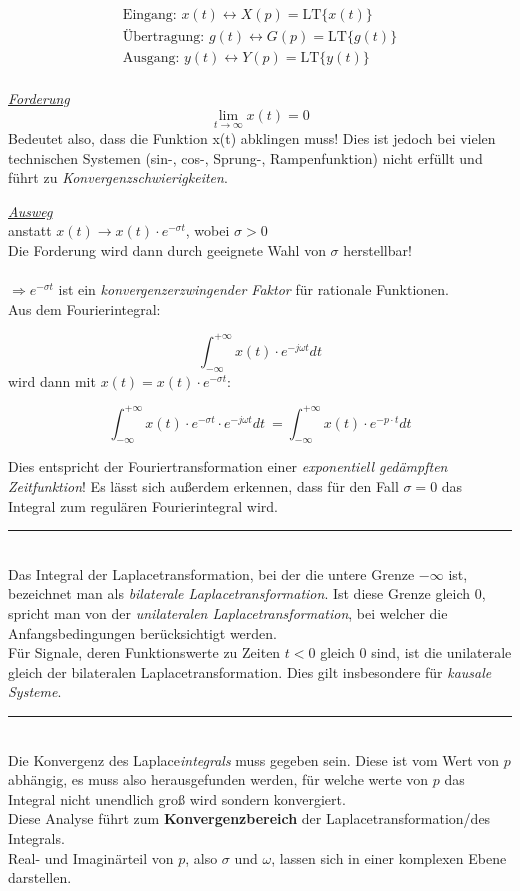 \documentclass[a4paper, 12pt]{article}
\newcommand{\holine}{
  \noindent\rule{\textwidth}{0.618pt}\\[0.021286\paperheight]
}
\newcommand{\minisec}[1]{ \underline{\textit {#1} } \\[0.021286\paperheight]}
\begin{document}
\begin{align*}
  \text{Eingang:  } x(t) \leftrightarrow X(p) = \text{LT}\{x(t)\}\\
  \text{Übertragung:  } g(t) \leftrightarrow G(p) = \text{LT}\{g(t)\}\\
  \text{Ausgang:  } y(t) \leftrightarrow Y(p) = \text{LT}\{y(t)\}\\
\end{align*}

\minisec{Forderung}
\[ \lim_{t\rightarrow \infty}{ x(t) } = 0\]
Bedeutet also, dass die Funktion x(t) abklingen muss!
Dies ist jedoch bei vielen technischen Systemen (sin-, cos-, Sprung-,
Rampenfunktion) nicht erfüllt und führt zu \emph{Konvergenzschwierigkeiten}.

\minisec{Ausweg}
anstatt $x(t) \rightarrow x(t) \cdot e^{-\sigma t}$, wobei $\sigma > 0$\\
Die Forderung wird dann durch geeignete Wahl von $\sigma$ herstellbar!\\

\\$\Rightarrow e^{-\sigma t}$ ist ein \emph{konvergenzerzwingender Faktor} für
rationale Funktionen.\\

Aus dem Fourierintegral:

\[ \int_{-\infty}^{+\infty}{ x(t) \cdot e^{-j\omega t} dt }\]
wird dann mit $x(t) = x(t) \cdot e^{-\sigma t}$:

\[ \int_{-\infty}^{+\infty}{ x(t) \cdot e^{-\sigma t} \cdot e^{-j\omega t} dt }\
  = \int_{-\infty}^{+\infty}{ x(t) \cdot e^{-p\cdot t}dt }\]


Dies entspricht der Fouriertransformation einer \emph{exponentiell gedämpften
  Zeitfunktion}! Es lässt sich außerdem erkennen, dass für den Fall $\sigma = 0$ das Integral zum
regulären Fourierintegral wird.

\holine
Das Integral der Laplacetransformation, bei der die untere Grenze $-\infty$ ist,
bezeichnet man als \emph{bilaterale Laplacetransformation}. Ist diese Grenze
gleich 0, spricht man von der \emph{unilateralen Laplacetransformation}, bei
welcher die Anfangsbedingungen berücksichtigt werden.\\
Für Signale, deren Funktionswerte zu Zeiten $t < 0$ gleich 0 sind, ist die unilaterale gleich der
bilateralen Laplacetransformation. Dies gilt insbesondere für \emph{kausale Systeme}.

\holine
Die Konvergenz des Laplace\emph{integrals} muss gegeben sein. Diese ist vom Wert
von $p$ abhängig, es muss also
herausgefunden werden, für welche werte von $p$ das Integral nicht
unendlich groß wird sondern konvergiert.\\
Diese Analyse führt zum {\bf{Konvergenzbereich}} der Laplacetransformation/des Integrals.\\


Real- und Imaginärteil von $p$, also $\sigma$ und $\omega$, lassen sich in einer
komplexen Ebene darstellen.
\end{document}
